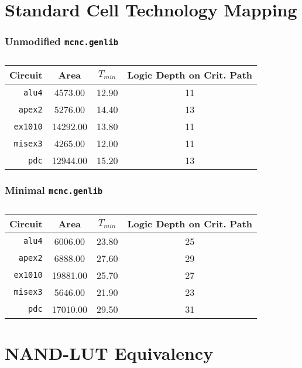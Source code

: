 \documentclass[12pt]{article}
\begin{document}
\part{Standard Cell Technology Mapping}
\section{Unmodified \texttt{mcnc.genlib}}
\begin{table}[H]\centering\begin{tabular}{ r | *3c }
\hline\hline
Circuit & Area & \(T_{min}\) & Logic Depth on Crit. Path \\
\hline
\texttt{alu4}   &  4573.00 & 12.90 & 11 \\
\texttt{apex2}  &  5276.00 & 14.40 & 13 \\
\texttt{ex1010} & 14292.00 & 13.80 & 11 \\
\texttt{misex3} &  4265.00 & 12.00 & 11 \\
\texttt{pdc}    & 12944.00 & 15.20 & 13 \\
\hline\hline
\end{tabular}\caption{}\label{tab:sc-map-on-full-lib}\end{table}

\section{Minimal \texttt{mcnc.genlib}}
\begin{table}[H]\centering\begin{tabular}{ r | *3c }
\hline\hline
Circuit & Area & \(T_{min}\) & Logic Depth on Crit. Path \\
\hline
\texttt{alu4}   &  6006.00 & 23.80 & 25 \\
\texttt{apex2}  &  6888.00 & 27.60 & 29 \\
\texttt{ex1010} & 19881.00 & 25.70 & 27 \\
\texttt{misex3} &  5646.00 & 21.90 & 23 \\
\texttt{pdc}    & 17010.00 & 29.50 & 31 \\
\hline\hline
\end{tabular}\caption{}\label{tab:sc-map-on-minimal-lib}\end{table}

\part{NAND-LUT Equivalency}
\end{document}
